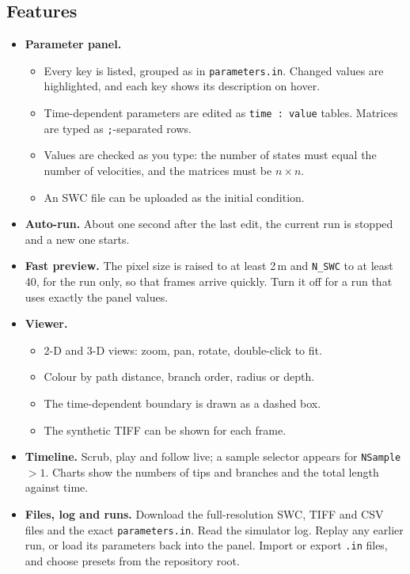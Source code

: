 \documentclass[11pt,a4paper]{article}
\newcommand{\code}[1]{\texttt{#1}}
\begin{document}
\subsection{Features}
\begin{itemize}
  \item \textbf{Parameter panel.}
  \begin{itemize}
    \item Every key is listed, grouped as in \code{parameters.in}. Changed values are highlighted, and each key shows its description on hover.
    \item Time-dependent parameters are edited as \code{time : value} tables. Matrices are typed as \code{;}-separated rows.
    \item Values are checked as you type: the number of states must equal the number of velocities, and the matrices must be $n\times n$.
    \item An SWC file can be uploaded as the initial condition.
  \end{itemize}
  \item \textbf{Auto-run.} About one second after the last edit, the current run is stopped and a new one starts.
  \item \textbf{Fast preview.} The pixel size is raised to at least 2\,\textmu m and \code{N\_SWC} to at least 40, for the run only, so that frames arrive quickly. Turn it off for a run that uses exactly the panel values.
  \item \textbf{Viewer.}
  \begin{itemize}
    \item 2-D and 3-D views: zoom, pan, rotate, double-click to fit.
    \item Colour by path distance, branch order, radius or depth.
    \item The time-dependent boundary is drawn as a dashed box.
    \item The synthetic TIFF can be shown for each frame.
  \end{itemize}
  \item \textbf{Timeline.} Scrub, play and follow live; a sample selector appears for \code{NSample}$>1$. Charts show the numbers of tips and branches and the total length against time.
  \item \textbf{Files, log and runs.} Download the full-resolution SWC, TIFF and CSV files and the exact \code{parameters.in}. Read the simulator log. Replay any earlier run, or load its parameters back into the panel. Import or export \code{.in} files, and choose presets from the repository root.
\end{itemize}
\end{document}
